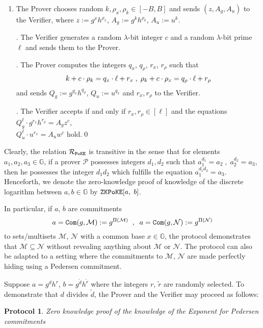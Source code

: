 \documentclass[11pt, lettersize, notitlepage, leqno, footskip=0.6cm]{article}
\newcommand{\ttt}{\texttt}
\newcommand{\bG}{\mathbb{G}}
\newcommand{\wti}{\widetilde}
\newcommand{\mc}{\mathcal}
\newcommand{\mb}{\mathbb}
\newcommand{\lam}{\lambda}
\newcommand{\sub}{\subseteq}
\newcommand{\mP}{\mc{P}}
\newcommand{\mcM}{\mc{M}}
\newcommand{\vs}{\vspace{-0.15cm}}
\newcommand{\noin}{\noindent}
\newtheorem{Prot}[Thm]{Protocol}
\numberwithin{equation}{section}
\begin{document}
\begin{enumerate}[wide, labelwidth=!, labelindent=0pt]\vs \item The Prover chooses random $k, \rho_x, \rho_k\in [-B,B]$ and sends $(z, A_g, A_u)$ to the Verifier, where $z:= g^xh^{\rho_x}$, $A_g:= g^kh^{\rho_k}$, $A_u:= u^k$.

\noin 2. The Verifier generates a random $\lam$-bit integer $c$ and a random $\lam$-bit prime $\ell$ and sends them to the Prover.

\noin 3. The Prover computes the integers $q_x$, $q_{\rho}$, $r_x$, $r_{\rho}$ such that \vs $$k+c\cdot \rho_k = q_x\cdot \ell + r_x\;,\; \rho_k+c\cdot \rho_x = q_{\rho}\cdot \ell + r_{\rho} \vs $$ and sends $Q_g:= g^{q_x}h^{q_{\rho}}$, $Q_u:= u^{q_x}$ and $r_x,r_{\rho}$ to the Verifier.

\noin 4. The Verifier accepts if and only if $r_x,r_{\rho}\in [\ell]$ and the equations $Q_g^{\ell}\cdot g^{r_x}h^{r_{\rho}} = A_gz^c$,\\ $Q_u^{\ell}\cdot u^{r_x} = A_u w^{c}  $ hold.\qed \end{enumerate}

\noin Clearly, the relation $\mc{R}_{\tt{PoKE}}$ is transitive in the sense that for elements $a_1,a_2,a_3\in\mb{G}$, if a prover $\mP$ possesses integers $d_1,d_2$ such that $a_1^{d_1} = a_2\;,\;a_2^{d_2} = a_3$, then he possesses the integer $d_1d_2$ which fulfills the equation $a_1^{d_1d_2} = a_3$. Henceforth, we denote the zero-knowledge proof of knowledge of the discrete logarithm between $a,b\in\mb{G}$ by $\verb|ZKPoKE|[a,\;b]$.

In particular, if $a$, $b$ are commitments \vs $$ a = \ttt{Com}(g, \mc{M}) := g^{\Pi(\mcM)}\;\;,\;\;a = \ttt{Com}(g, \mc{N}) := g^{\Pi(\mc{N})}  \vs $$ to sets/multisets $\mcM$, $\mc{N}$ with  a common base $x\in\bG$, the protocol demonstrates that $\mcM\sub \mc{N}$ without revealing anything about $\mcM$ or $\mc{N}$. The protocol can also be adapted to a setting where the commitments to $\mc{M}$, $\mc{N}$ are made perfectly hiding using a Pedersen commitment.

Suppose $a = g^{d}h^{r}$, $b = g^{\wti{d}}h^{\wti{r}}$ where the integers $r$, $\wti{r}$ are randomly selected. To demonstrate that $d$ divides $\wti{d}$, the Prover and the Verifier may proceed as follows:\vspace{0.1cm}

\begin{Prot} \normalfont \hypertarget{ZKPoKEPed}{\textit{Zero knowledge proof of the knowledge of the Exponent for Pedersen commitments}} \end{Prot} \vspace{-0.3cm}
\end{document}
